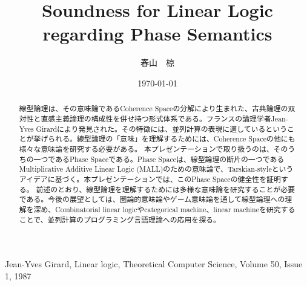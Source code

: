 \documentclass{jarticle}
\title{Soundness for Linear Logic regarding Phase Semantics}
\author{春山　椋}
\date{\today}
\theoremstyle{break} %
\theoremstyle{definition}
\begin{document}
\maketitle

\begin{abstract}
  線型論理\cite{girard87}は、その意味論であるCoherence Spaceの分解により生まれた、古典論理の双対性と直感主義論理の構成性を併せ持つ形式体系である。フランスの論理学者Jean-Yves Girardにより発見された。その特徴には、並列計算の表現に適しているということが挙げられる。線型論理の「意味」を理解するためには、Coherence Spaceの他にも様々な意味論を研究する必要がある。
本プレゼンテーションで取り扱うのは、そのうちの一つであるPhase Spaceである。Phase Spaceは、線型論理の断片の一つであるMultiplicative Additive Linear Logic (MALL)のための意味論で、Tarskian-styleというアイデアに基づく。本プレゼンテーションでは、このPhase Spaceの健全性を証明する。
前述のとおり、線型論理を理解するためには多様な意味論を研究することが必要である。今後の展望としては、圏論的意味論やゲーム意味論を通して線型論理への理解を深め、Combinatorial linear logicやcategorical machine、linear machineを研究することで、並列計算のプログラミング言語理論への応用を探る。
\end{abstract}

\begin{thebibliography}{99}
  Jean-Yves Girard,
  Linear logic,
  Theoretical Computer Science,
  Volume 50, Issue 1,
  1987
\end{thebibliography}
\end{document}
